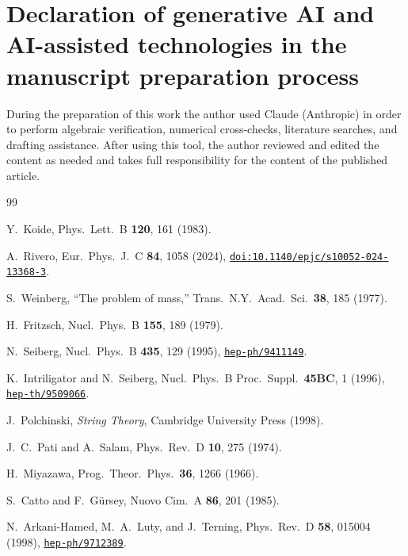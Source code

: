 \documentclass[12pt,a4paper]{article}
\begin{document}
\section*{Declaration of generative AI and AI-assisted technologies
  in the manuscript preparation process}

During the preparation of this work the author used Claude
(Anthropic) in order to perform algebraic verification, numerical
cross-checks, literature searches, and drafting assistance.
After using this tool, the author reviewed and edited the content
as needed and takes full responsibility for the content of the
published article.

\begin{thebibliography}{99}

  Y.~Koide,
  Phys.\ Lett.\ B \textbf{120}, 161 (1983).

  A.~Rivero,
  Eur.\ Phys.\ J.\ C \textbf{84}, 1058 (2024),
  \href{https://doi.org/10.1140/epjc/s10052-024-13368-3}%
    {\texttt{doi:10.1140/epjc/s10052-024-13368-3}}.

  S.~Weinberg,
  ``The problem of mass,''
  Trans.\ N.Y.\ Acad.\ Sci.\ \textbf{38}, 185 (1977).

  H.~Fritzsch,
  Nucl.\ Phys.\ B \textbf{155}, 189 (1979).

  N.~Seiberg,
  Nucl.\ Phys.\ B \textbf{435}, 129 (1995),
  \href{https://arxiv.org/abs/hep-ph/9411149}{\texttt{hep-ph/9411149}}.

  K.~Intriligator and N.~Seiberg,
  Nucl.\ Phys.\ B Proc.\ Suppl.\ \textbf{45BC}, 1 (1996),
  \href{https://arxiv.org/abs/hep-th/9509066}{\texttt{hep-th/9509066}}.

  J.~Polchinski,
  \textit{String Theory},
  Cambridge University Press (1998).

  J.~C.~Pati and A.~Salam,
  Phys.\ Rev.\ D \textbf{10}, 275 (1974).

  H.~Miyazawa,
  Prog.\ Theor.\ Phys.\ \textbf{36}, 1266 (1966).

  S.~Catto and F.~G\"ursey,
  Nuovo Cim.\ A \textbf{86}, 201 (1985).

  N.~Arkani-Hamed, M.~A.~Luty, and J.~Terning,
  Phys.\ Rev.\ D \textbf{58}, 015004 (1998),
  \href{https://arxiv.org/abs/hep-ph/9712389}{\texttt{hep-ph/9712389}}.


\end{thebibliography}
\end{document}
